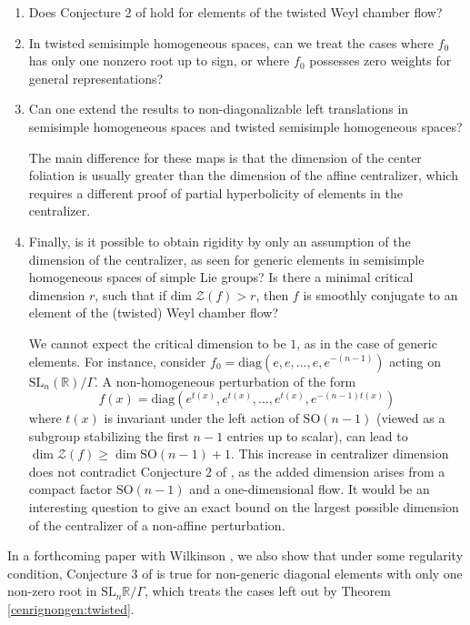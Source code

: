 \documentclass[11pt]{amsart}
\numberwithin{equation}{section}
\newcommand{\R}{\mathbb{R}}
\theoremstyle{plain}
\begin{document}
\begin{enumerate}
    \item Does Conjecture 2 of \cite{DWWX} hold for elements of the twisted Weyl chamber flow?

    \item In twisted semisimple homogeneous spaces, can we treat the cases where \(f_0\) has only one nonzero root up to sign, or where \(f_0\) possesses zero weights for general representations?

    \item  Can one extend the results to non-diagonalizable left translations in semisimple homogeneous spaces and twisted semisimple homogeneous spaces? 
    
    The main difference for these maps is that the dimension of the center foliation is usually greater than the dimension of the affine centralizer, which requires a different proof of partial hyperbolicity of elements in the centralizer.

    \item Finally, is it possible to obtain rigidity by only an assumption of the dimension of the centralizer, as seen for generic elements in semisimple homogeneous spaces of simple Lie groups? Is there a minimal critical dimension $r$, such that if $\mathrm{dim} \;\mathcal Z(f)> r$, then $f$ is smoothly conjugate to an element of the (twisted) Weyl chamber flow?
    
    We cannot expect the critical dimension to be $1$, as in the case of generic elements. For instance, consider \(f_0=\mathrm{diag}(e,e,\ldots,e,e^{-(n-1)})\) acting on \(\mathrm{SL}_n(\mathbb{R})/\Gamma\). A non-homogeneous perturbation of the form
    \[
    f(x)=\mathrm{diag}(e^{t(x)},e^{t(x)},\ldots,e^{t(x)},e^{-(n-1) t(x)})
    \]
    where \(t(x)\) is invariant under the left action of \(\mathrm{SO}(n-1)\) (viewed as a subgroup stabilizing the first \(n-1\) entries up to scalar), can lead to \(\dim \mathcal Z(f)\ge \dim \mathrm{SO}(n-1)+1\). This increase in centralizer dimension does not contradict Conjecture 2 of \cite{DWWX}, as the added dimension arises from a compact factor \(\mathrm{SO}(n-1)\) and a one-dimensional flow. It would be an interesting question to give an exact bound on the largest possible dimension of the centralizer of a non-affine perturbation.
\end{enumerate}

In a forthcoming paper with Wilkinson \cite{WangWil}, we also show that under some regularity condition, Conjecture 3 of \cite{DWWX} is true for non-generic diagonal elements with only one non-zero root in $\mathrm{SL}_n\R/\Gamma$, which treats the cases left out by Theorem \ref{cenrignongen:twisted}.
\end{document}
